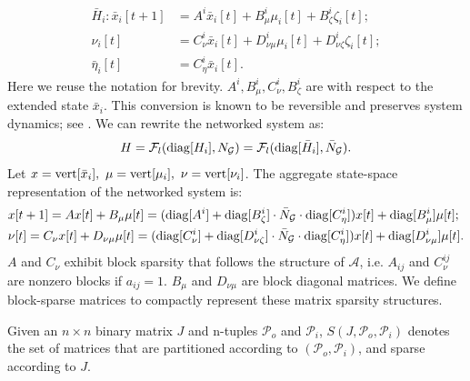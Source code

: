 \begin{subequations}
\begin{align}
    \bar{H}_i \colon \bar{x}_i[t+1] &=  A^i \bar{x}_i[t] + B_{\mu}^i \mu_i[t]  + B_\zeta^{i} \zeta_{i}[t]; \\
    \nu_i[t] & = C_{\nu}^i \bar{x}_i[t] + D_{\nu\mu}^i \mu_i[t] + D_{\nu\zeta}^{i} \zeta_{i}[t]; \\
    \bar{\eta}_{i}[t] & = C_\eta^{i} \bar{x}_i[t].   
\end{align}
\end{subequations}
Here we reuse the notation for brevity. $A^i, B_\mu^i, C_\nu^i, B_\zeta^i$ are with respect to the extended state $\bar{x}_i$. This conversion is known to be reversible and preserves system dynamics; see \cite{Vamsi_Realizable, naghnaeian2019youla}.
We can rewrite the networked system as:
\[
H = {\mathcal{F}_l}({\mathrm{diag}}[H_i], N_{\cal G}) =  {\mathcal{F}_l}({\mathrm{diag}}[\bar{H}_i], \bar{N}_{\cal G}).
\]
Let \(x = {\mathrm{vert}}[\bar{x}_i],\ \mu = {\mathrm{vert}}[\mu_i],\ \nu = {\mathrm{vert}}[\nu_i]\). 
The aggregate state-space representation of the networked system is:
\begin{equation*}
\begin{split}
    & x[t + 1] = A x[t] + B_\mu \mu[t] = ({\mathrm{diag}}[A^i] + {\mathrm{diag}}[B_\zeta^i] \cdot \bar{N}_{\cal G} \cdot {\mathrm{diag}}[C_\eta^i]) x[t] + {\mathrm{diag}}[B_\mu^i] \mu[t]; \\
    &\nu[t]  = C_\nu x[t] + D_{\nu\mu} \mu[t] = ({\mathrm{diag}}[C_\nu^i] + {\mathrm{diag}}[D_{\nu\zeta}^i] \cdot \bar{N}_{\cal G} \cdot {\mathrm{diag}}[C_\eta^i]) x[t] + {\mathrm{diag}}[D_{\nu\mu}^i] \mu[t].
\end{split}
\end{equation*}
\(A\) and \(C_\nu\) exhibit block sparsity that follows the structure of \(\mathcal{A}\), i.e. \(A_{ij}\) and \(C_\nu^{ij}\) are nonzero blocks if \(a_{ij} = 1\). \(B_\mu\) and \(D_{\nu\mu}\) are block diagonal matrices.
We define block-sparse matrices to compactly represent these matrix sparsity structures.
\begin{defn}\label{defn::strmat}
Given an \(n\times n\) binary matrix \(J\) and n-tuples \(\mathcal{P}_o\) and  \(\mathcal{P}_i\), \(S(J,\mathcal{P}_o,\mathcal{P}_i)\) 
denotes the set of matrices that are partitioned according to \((\mathcal{P}_o,\mathcal{P}_i)\), and sparse according to \(J\).
\end{defn}


